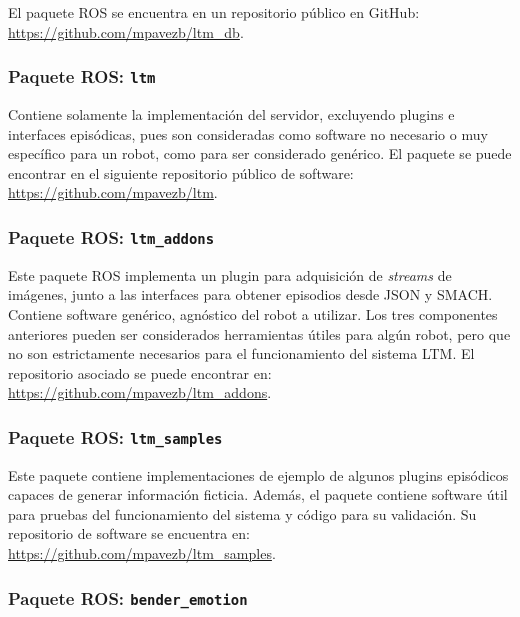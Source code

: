 El paquete ROS se encuentra en un repositorio público en GitHub: \url{https://github.com/mpavezb/ltm\_db}.


\subsubsection{Paquete ROS: \texttt{ltm}}

Contiene solamente la implementación del servidor, excluyendo plugins e interfaces episódicas, pues son consideradas como software no necesario o muy específico para un robot, como para ser considerado genérico. El paquete se puede encontrar en el siguiente repositorio público de software: \url{https://github.com/mpavezb/ltm}.


\subsubsection{Paquete ROS: \texttt{ltm\_addons}}

Este paquete ROS implementa un plugin para adquisición de \textit{streams} de imágenes, junto a las interfaces para obtener episodios desde JSON y SMACH. Contiene software genérico, agnóstico del robot a utilizar. Los tres componentes anteriores pueden ser considerados herramientas útiles para algún robot, pero que no son estrictamente necesarios para el funcionamiento del sistema LTM. El repositorio asociado se puede encontrar en: \url{https://github.com/mpavezb/ltm\_addons}.


\subsubsection{Paquete ROS: \texttt{ltm\_samples}}

Este paquete contiene implementaciones de ejemplo de algunos plugins episódicos capaces de generar información ficticia. Además, el paquete contiene software útil para pruebas del funcionamiento del sistema y código para su validación. Su repositorio de software se encuentra en: \url{https://github.com/mpavezb/ltm\_samples}.


\subsubsection{Paquete ROS: \texttt{bender\_emotion}}

